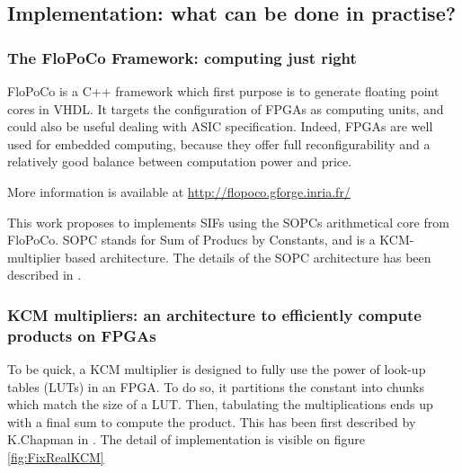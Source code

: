 	\subsection{Implementation: what can be done in practise?}

	\subsubsection{The FloPoCo Framework: computing just right}
		FloPoCo is a C++ framework \cite{DinechinPasca2011-DaT} which first purpose is to generate floating point cores in VHDL.
		It targets the configuration of FPGAs as computing units, and could also be useful dealing with ASIC specification.
		Indeed, FPGAs are well used for embedded computing, because they offer full reconfigurability and a relatively good balance between computation power and price.

		More information is available at \url{http://flopoco.gforge.inria.fr/}

	This work proposes to implements SIFs using the SOPCs arithmetical core from FloPoCo.
	SOPC stands for Sum of Producs by Constants, and is a KCM-multiplier based architecture.
	The details of the SOPC architecture has been described in \cite{sums}.

	\subsubsection{KCM multipliers: an architecture to efficiently compute products on FPGAs}
	To be quick, a KCM multiplier is designed to fully use the power of look-up tables (LUTs) in an FPGA.
	To do so, it partitions the constant into chunks which match the size of a LUT.
	Then, tabulating the multiplications ends up with a final sum to compute the product.
	This has been first described by K.Chapman in \cite{Chapman93:edn}.
	The detail of implementation is visible on figure \ref{fig:FixRealKCM}

